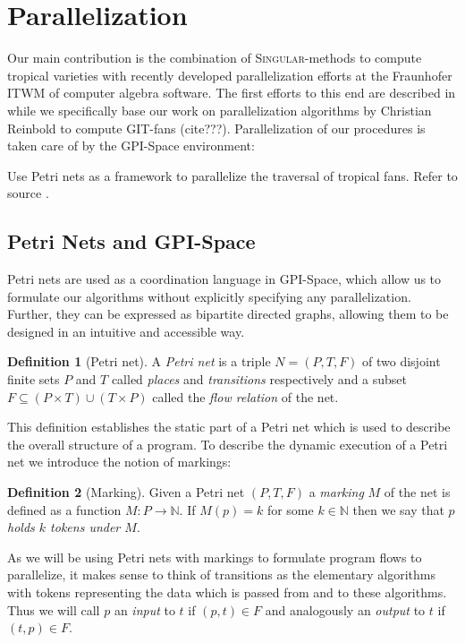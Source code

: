\documentclass[
  paper=a4,
  titlepage,
  bibliography=totoc,
  listof=totoc,
  pagesize=pdftex
]{scrartcl}
\numberwithin{figure}{section}
\numberwithin{equation}{section}
\numberwithin{table}{section}
\newcommand*\setN{\mathds{N}}
\theoremstyle{definition}
\newtheorem{definition}{Definition}
\numberwithin{definition}{section}
\begin{document}
\section{Parallelization}

Our main contribution is the combination of \textsc{Singular}-methods to compute tropical
varieties with recently developed parallelization efforts at the Fraunhofer ITWM of
computer algebra software. The first efforts to this end are described in
\cite{towardsParallel} while we specifically base our work on parallelization algorithms
by Christian Reinbold to compute GIT-fans (cite???). Parallelization of our procedures is
taken care of by the GPI-Space environment:

Use Petri nets as a framework to parallelize the traversal of tropical fans. Refer to
source \cite{towardsParallel}.

\subsection{Petri Nets and GPI-Space}

Petri nets are used as a coordination language in GPI-Space, which allow us to formulate
our algorithms without explicitly specifying any parallelization. Further, they can be
expressed as bipartite directed graphs, allowing them to be designed in an intuitive and
accessible way.

\begin{definition}[Petri net]
  \label{def:petri}
  A \emph{Petri net} is a triple $N = (P, T, F)$ of two disjoint finite sets $P$ and $T$
  called \emph{places} and \emph{transitions} respectively and a subset $F \subseteq
  (P\times T) \cup (T \times P)$ called the \emph{flow relation} of the net.
\end{definition}

This definition establishes the static part of a Petri net which is used to describe the
overall structure of a program. To describe the dynamic execution of a Petri net we
introduce the notion of markings:

\begin{definition}[Marking]
  \label{def:marking}
  Given a Petri net $(P,T,F)$ a \emph{marking} $M$ of the net is defined as a function $M
  : P \to \setN$. If $M(p) = k$ for some $k \in \setN$ then we say that $p$ \emph{holds
  $k$ tokens under $M$}.
\end{definition}

As we will be using Petri nets with markings to formulate program flows to parallelize, it
makes sense to think of transitions as the elementary algorithms with tokens representing
the data which is passed from and to these algorithms. Thus we will call $p$ an
\emph{input} to $t$ if $(p,t) \in F$ and analogously an \emph{output} to $t$ if $(t,p) \in
F$.
\end{document}
